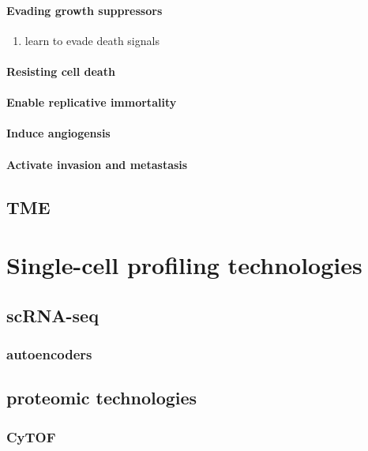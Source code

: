 \paragraph{Evading growth suppressors}
\begin{enumerate}
  \item learn to evade death signals
\end{enumerate}

\paragraph{Resisting cell death}

\paragraph{Enable replicative immortality}

\paragraph{Induce angiogensis}

\paragraph{Activate invasion and metastasis}

\subsection{TME}


\section{Single-cell profiling technologies}

\subsection{scRNA-seq}
\subsubsection{autoencoders}

\subsection{proteomic technologies}
\subsubsection{CyTOF}

